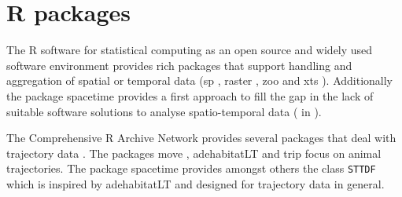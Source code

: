 \documentclass[12pt, oneside, a4paper]{scrbook}
\newcommand{\pkg}[1]{{\normalfont\fontseries{b}\selectfont #1}}
\let\proglang=\textsf
\let\code=\texttt
\begin{document}


\section{\proglang{R} packages}


The \proglang{R} software for statistical computing \citep{r_development_core_team_r:_2014} as an open source and widely used software environment provides rich packages that support handling and aggregation of spatial or temporal data (\pkg{sp} \citep{pebesma_sp:_2014}, \pkg{raster} \citep{hijmans_raster:_2014}, \pkg{zoo} \citep{zeileis_zoo:_2014} and \pkg{xts} \citep{ryan_xts:_2014}).
Additionally the package \pkg{spacetime} \citep{pebesma_spacetime:_2012} provides a first approach to fill the gap in the lack of suitable software solutions to analyse spatio-temporal data (\citet{schabenberger_statistical_2004} in \citet{pebesma_spacetime:_2012}). 
\par\medskip

The Comprehensive \proglang{R} Archive Network provides several packages that deal with trajectory data \citep{pebesma_cran_2014}. The packages \pkg{move} \citep{kranstauber_move:_2014}, \pkg{adehabitatLT} \citep{calenge_adehabitatlt:_2014} and \pkg{trip} \citep{sumner_trip:_2013} focus on animal trajectories. The package \pkg{spacetime} provides amongst others the class \code{STTDF} which is inspired by \pkg{adehabitatLT} \citep{bivand_applied_2008} and designed for trajectory data in general.
\par\medskip
\end{document}
